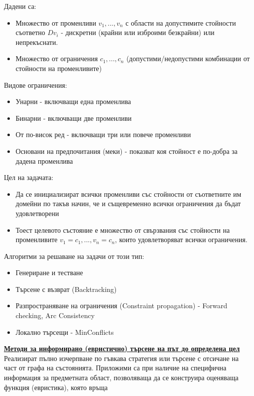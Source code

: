 \documentclass{article}
\begin{document}
\begin{enumerate}
    Дадени са:
    \begin{itemize}
        \item Множество от променливи $v_1, ..., v_n$ с области на допустимите стойности съответно $Dv_i$ -
        дискретни (крайни или изброими безкрайни) или непрекъснати.
        \item Множество от ограничения $c_1, ..., c_n$ (допустими/недопустими комбинации от стойности на променливите)
    \end{itemize}
    Видове ограничения:
    \begin{itemize}
        \item Унарни - включващи една променлива
        \item Бинарни - включващи две променливи
        \item От по-висок ред - включващи три или повече променливи
        \item Основани на предпочитания (меки) - показват коя стойност е по-добра за дадена променлива
    \end{itemize}
    Цел на задачата:
    \begin{itemize}
        \item Да се инициализират всички променливи със стойности от съответните им домейни по такъв начин, че и същевременно
        всички ограничения да бъдат удовлетворени
        \item Тоест целевото състояние е множество от свързвания със стойности на променливите $v_1 = c_1, ..., v_n = c_n$, които
        удовлетворяват всички ограничения.
    \end{itemize}
    Алгоритми за решаване на задачи от този тип:
    \begin{itemize}
        \item Генериране и тестване
        \item Търсене с възврат (Backtracking)
        \item Разпространяване на ограничения (Constraint propagation) - Forward checking, Arc Consistency
        \item Локално търсещи - MinConflicts
    \end{itemize}
\end{enumerate}
\textbf{\underline{Методи за информирано (евристично) търсене на път до определена цел}} \newline\newline
Реализират пълно изчерпване по гъвкава стратегия или търсене с отсичане на част от графа на състоянията. Приложими са при
наличие на специфична информация за предметната област, позволяваща да се конструира оценяваща функция (евристика), която връща
\end{document}
